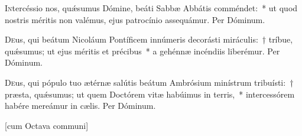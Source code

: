 \documentclass[vesperale_romanum.tex]{subfiles}
\begin{document}

\myrule



\oratio

\lettrine{I}{n}tercéssio nos, quǽsumus Dómine, beáti Sabbæ Abbátis comméndet:~* ut quod nostris méritis non valémus, ejus patrocínio assequámur. Per Dóminum.

\myrule


\duplex

\oratio

\lettrine{D}{e}us, qui beátum Nicoláum Pontíficem innúmeris decorásti miráculis:~† tríbue, quǽsumus; ut ejus méritis et précibus~* a gehénnæ incéndiis liberémur. Per Dóminum.

\myrule


\duplexmtv


\oratio

\lettrine{D}{e}us, qui pópulo tuo ætérnæ salútis beátum Ambrósium minístrum tribuísti:~† præsta, quǽsumus; ut quem Do\-ctórem vitæ habúimus in terris,~* intercessórem habére mereámur in cælis. Per Dóminum.





\myrule


\thispagestyle{empty}
\label{8_decembris}

[cum Octava communi]
\end{document}
